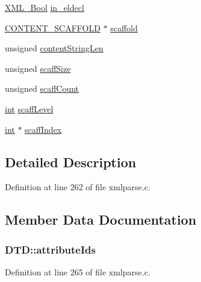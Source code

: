 \begin{DoxyCompactItemize}
\hyperlink{amiga_2include_2libraries_2expat_8h_a5fe41bca8b7a23b2405f1b967e70f33a}{X\+M\+L\+\_\+\+Bool} \hyperlink{struct_d_t_d_a630d8d6c02b942daccb0b763533575d5}{in\+\_\+eldecl}
\item 
\hyperlink{struct_c_o_n_t_e_n_t___s_c_a_f_f_o_l_d}{C\+O\+N\+T\+E\+N\+T\+\_\+\+S\+C\+A\+F\+F\+O\+LD} $\ast$ \hyperlink{struct_d_t_d_a41d29527f2c2b5126d663f5316435697}{scaffold}
\item 
unsigned \hyperlink{struct_d_t_d_a06377f1149c7a2ad3c2d932f2844acdf}{content\+String\+Len}
\item 
unsigned \hyperlink{struct_d_t_d_a31cf19bf796dd6cda1705418bc1dc601}{scaff\+Size}
\item 
unsigned \hyperlink{struct_d_t_d_af2f963a74af5574dfbb80b3529c023a8}{scaff\+Count}
\item 
\hyperlink{xmltok_8h_a5a0d4a5641ce434f1d23533f2b2e6653}{int} \hyperlink{struct_d_t_d_a6a88dfceb3b17719c9614b3a69be2224}{scaff\+Level}
\item 
\hyperlink{xmltok_8h_a5a0d4a5641ce434f1d23533f2b2e6653}{int} $\ast$ \hyperlink{struct_d_t_d_a4bc4523f86658647920aaf827eb1ecdd}{scaff\+Index}
\end{DoxyCompactItemize}


\subsection{Detailed Description}


Definition at line 262 of file xmlparse.\+c.



\subsection{Member Data Documentation}
\subsubsection[{\texorpdfstring{attribute\+Ids}{attributeIds}}]{ D\+T\+D\+::attribute\+Ids}\hypertarget{struct_d_t_d_a3bc0ac47b4a74de3721d991fc6209243}{}\label{struct_d_t_d_a3bc0ac47b4a74de3721d991fc6209243}


Definition at line 265 of file xmlparse.\+c.

